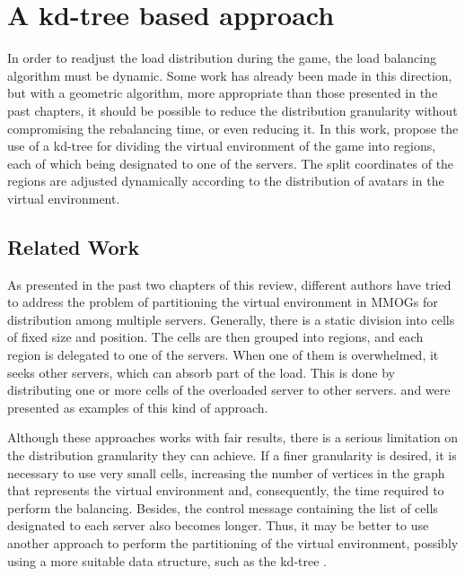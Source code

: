 \chapter{A kd-tree based approach}

In order to readjust the load distribution during the game, the load balancing algorithm must be dynamic. Some work has already been made in this direction, but with a geometric algorithm, more appropriate than those presented in the past chapters, it should be possible to reduce the distribution granularity without compromising the rebalancing time, or even reducing it. In this work, \cite{bezerra2009fgl} propose the use of a kd-tree for dividing the virtual environment of the game into regions, each of which being designated to one of the servers. The split coordinates of the regions are adjusted dynamically according to the distribution of avatars in the virtual environment.



\section{Related Work}
\label{context}

As presented in the past two chapters of this review, different authors have tried to address the problem of partitioning the virtual environment in MMOGs for distribution among multiple servers. Generally, there is a static division into cells of fixed size and position. The cells are then grouped into regions, and each region is delegated to one of the servers. When one of them is overwhelmed, it seeks other servers, which can absorb part of the load. This is done by distributing one or more cells of the overloaded server to other servers. \cite{ahmed2008mol} and \cite{bezerra2009lbs} were presented as examples of this kind of approach.

Although these approaches works with fair results, there is a serious limitation on the distribution granularity they can achieve. If a finer granularity is desired, it is necessary to use very small cells, increasing the number of vertices in the graph that represents the virtual environment and, consequently, the time required to perform the balancing. Besides, the control message containing the list of cells designated to each server also becomes longer. Thus, it may be better to use another approach to perform the partitioning of the virtual environment, possibly using a more suitable data structure, such as the kd-tree \cite{bentley1975mbs}.

